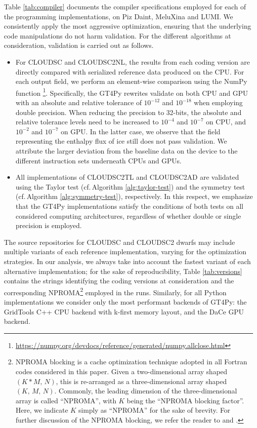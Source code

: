 \documentclass[gmd,manuscript,online]{copernicus}
\theoremstyle{theorem}
\theoremstyle{definition}
\theoremstyle{remark}
\theoremstyle{proposition}
\begin{document}
	\noindent Table \ref{tab:compiler} documents the compiler specifications employed for each of the programming implementations, on Piz Daint, MeluXina and LUMI. We consistently apply the most aggressive optimization, ensuring that the underlying code manipulations do not harm validation. For the different algorithms at consideration, validation is carried out as follows.
	\begin{itemize}
		\item For CLOUDSC and CLOUDSC2NL, the results from each coding version are directly compared with serialized reference data produced on the CPU. For each output field, we perform an element-wise comparison using the NumPy function \footnote{\url{https://numpy.org/devdocs/reference/generated/numpy.allclose.html}}. Specifically, the GT4Py rewrites validate on both CPU and GPU with an absolute and relative tolerance of $10^{-12}$ and $10^{-18}$ when employing double precision. When reducing the precision to 32-bits, the absolute and relative tolerance levels need to be increased to $10^{-4}$ and $10^{-7}$ on CPU, and $10^{-2}$ and $10^{-7}$ on GPU. In the latter case, we observe that the field representing the enthalpy flux of ice still does not pass validation. We attribute the larger deviation from the baseline data on the device to the different instruction sets underneath CPUs and GPUs.
		\item All implementations of CLOUDSC2TL and CLOUDSC2AD are validated using the Taylor test (cf.\,Algorithm \ref{alg:taylor-test}) and the symmetry test (cf.\,Algorithm \ref{alg:symmetry-test}), respectively. In this respect, we emphasize that the GT4Py implementations satisfy the conditions of both tests on all considered computing architectures, regardless of whether double or single precision is employed.
	\end{itemize}
	\noindent The source repositories for CLOUDSC and CLOUDSC2 dwarfs may include multiple variants of each reference implementation, varying for the optimization strategies. In our analysis, we always take into account the fastest variant of each alternative implementation; for the sake of reproducibility, Table \ref{tab:versions} contains the strings identifying the coding versions at consideration and the corresponding NPROMA\footnote{NPROMA blocking is a cache optimization technique adopted in all Fortran codes considered in this paper. Given a two-dimensional array shaped $(K * M, \, N)$, this is re-arranged as a three-dimensional array shaped $(K, \, M, \, N)$. Commonly, the leading dimension of the three-dimensional array is called ``NPROMA'', with $K$ being the ``NPROMA blocking factor''. Here, we indicate $K$ simply as ``NPROMA'' for the sake of brevity. For further discussion of the NPROMA blocking, we refer the reader to \citet{muller19} and \citet{bauer20}.} employed in the runs. Similarly, for all Python implementations we consider only the most performant backends of GT4Py: the GridTools C++ CPU backend with k-first memory layout, and the DaCe GPU backend.
\end{document}
